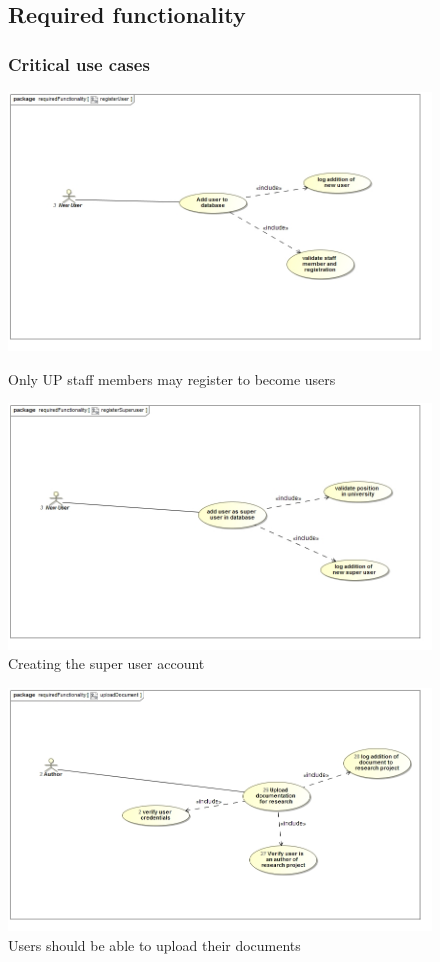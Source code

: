 \documentclass[a4paper,12pt]{report}
\begin{document}
\begin{figure}[ht]
\subsection{Required functionality}
\subsubsection{Critical use cases}
\includegraphics[scale=0.5]{uc__registerUser.jpg}
\caption{Only UP staff members may register to become users}


\includegraphics[scale=0.5]{uc__registerSuperuser.jpg} 
\caption{Creating the super user account}

\end{figure}
\newpage
\begin{figure}[ht]

\includegraphics[scale=0.5]{uc__uploadDocument.jpg}
\caption{Users should be able to upload their documents} 


\end{figure}
\end{document}
